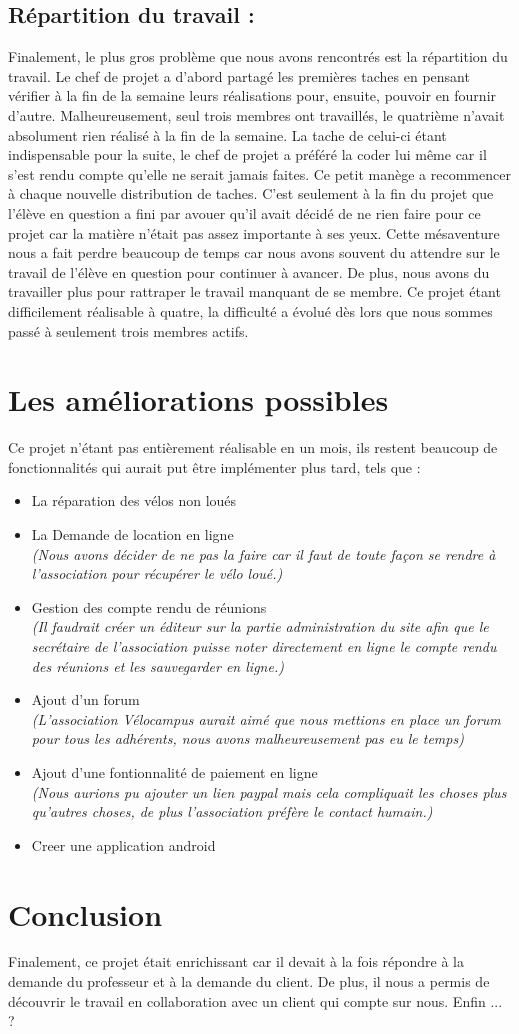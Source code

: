\documentclass[11pt,a4paper,titlepage]{report}
\begin{document}
\section{Répartition du travail : }
Finalement, le plus gros problème que nous avons rencontrés est la répartition du travail. 
Le chef de projet a d'abord partagé les premières taches en pensant vérifier à la fin de la semaine leurs réalisations pour, ensuite, pouvoir en fournir d'autre. Malheureusement, seul trois membres ont travaillés, le quatrième n'avait absolument rien réalisé à la fin de la semaine. 
La tache de celui-ci étant indispensable pour la suite, le chef de projet a préféré la coder lui même car il s'est rendu compte qu'elle ne serait jamais faites.
Ce petit manège a recommencer à chaque nouvelle distribution de taches. C'est seulement à la fin du projet que l'élève en question a fini par avouer qu'il avait décidé de ne rien faire pour ce projet car la matière n'était pas assez importante à ses yeux. Cette mésaventure nous a fait perdre beaucoup de temps car nous avons souvent du attendre sur le travail de l'élève en question pour continuer à avancer. De plus, nous avons du travailler plus pour rattraper le travail manquant de se membre.
Ce projet étant difficilement réalisable à quatre, la difficulté a évolué dès lors que nous sommes passé à seulement trois membres actifs. 
\chapter{Les améliorations possibles}
Ce projet n'étant pas entièrement réalisable en un mois, ils restent beaucoup de fonctionnalités qui aurait put être implémenter plus tard, tels que : \\
\begin{itemize}
\item La réparation des vélos non loués 
\item La Demande de location en ligne \\
\textit{(Nous avons décider de ne pas la faire car il faut de toute façon se rendre à l'association pour récupérer le vélo loué.)}
\item Gestion des compte rendu de réunions \\ \textit{(Il faudrait créer un éditeur sur la partie administration du site afin que le secrétaire de l'association puisse noter directement en ligne le compte rendu des réunions et les sauvegarder en ligne.)} 
\item Ajout d'un forum \\
\textit{(L'association Vélocampus aurait aimé que nous mettions en place un forum pour tous les adhérents, nous avons malheureusement pas eu le temps)} 
\item Ajout d'une fontionnalité de paiement en ligne \\
\textit{(Nous aurions pu ajouter un lien paypal mais cela compliquait les choses plus qu'autres choses, de plus l'association préfère le contact humain.)} 
\item Creer une application android
\end{itemize}
\chapter*{Conclusion}
Finalement, ce projet était enrichissant car il devait à la fois répondre à la demande du professeur et à la demande du client. 
De plus, il nous a permis de découvrir le travail en collaboration avec un client qui compte sur nous. Enfin ... ?
\end{document}
